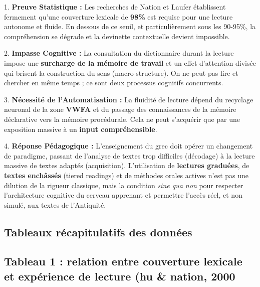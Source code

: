 {1. \textbf{Preuve Statistique :} Les recherches de Nation et Laufer établissent fermement qu'une
couverture lexicale de \textbf{98\%} est requise pour une lecture autonome et fluide. En dessous de
ce seuil, et particulièrement sous les 90-95\%, la compréhension se dégrade et la devinette
contextuelle devient impossible.

2. \textbf{Impasse Cognitive :} La consultation du dictionnaire durant la lecture impose une
\textbf{surcharge de la mémoire de travail} et un effet d'attention divisée qui brisent la
construction du sens (macro-structure). On ne peut pas \og lire\fg{} et \og chercher\fg{} en même
temps ; ce sont deux processus cognitifs concurrents.

3. \textbf{Nécessité de l'Automatisation :} La fluidité de lecture dépend du recyclage neuronal de
la zone \textbf{VWFA} et du passage des connaissances de la mémoire déclarative vers la mémoire
procédurale. Cela ne peut s'acquérir que par une exposition massive à un \textbf{input
compréhensible}.

4. \textbf{Réponse Pédagogique :} L'enseignement du grec doit opérer un changement de paradigme,
passant de l'analyse de textes trop difficiles (décodage) à la lecture massive de textes adaptés
(acquisition). L'utilisation de \textbf{lectures graduées}, de \textbf{textes enchâssés} (tiered
readings) et de méthodes orales actives n'est pas une \og dilution\fg{} de la rigueur classique,
mais la condition \textit{sine qua non} pour respecter l'architecture cognitive du cerveau apprenant
et permettre l'accès réel, et non simulé, aux textes de l'Antiquité.



\subsection{Tableaux récapitulatifs des données}



\subsection{Tableau 1 : relation entre couverture lexicale et expérience de lecture (hu \& nation, 2000\)}

}

